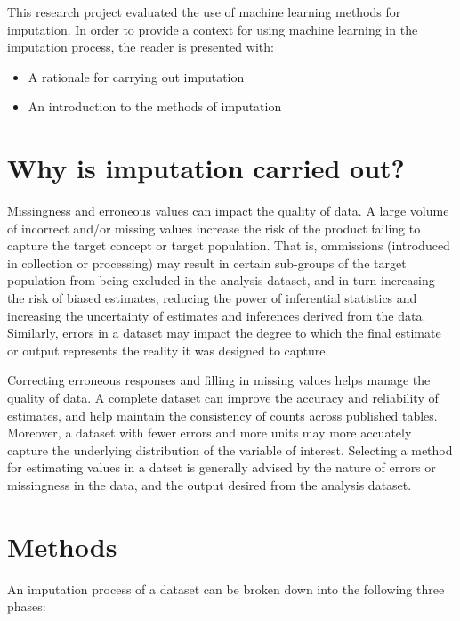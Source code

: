 \documentclass[]{book}
\providecommand{\tightlist}{%
  \setlength{\itemsep}{0pt}\setlength{\parskip}{0pt}}
\begin{document}
This research project evaluated the use of machine learning methods for
imputation. In order to provide a context for using machine learning in
the imputation process, the reader is presented with:

\begin{itemize}
\tightlist
\item
  A rationale for carrying out imputation\\
\item
  An introduction to the methods of imputation
\end{itemize}

\section{Why is imputation carried
out?}\label{why-is-imputation-carried-out}

Missingness and erroneous values can impact the quality of data. A large
volume of incorrect and/or missing values increase the risk of the
product failing to capture the target concept or target population. That
is, ommissions (introduced in collection or processing) may result in
certain sub-groups of the target population from being excluded in the
analysis dataset, and in turn increasing the risk of biased estimates,
reducing the power of inferential statistics and increasing the
uncertainty of estimates and inferences derived from the data.
Similarly, errors in a dataset may impact the degree to which the final
estimate or output represents the reality it was designed to capture.

Correcting erroneous responses and filling in missing values helps
manage the quality of data. A complete dataset can improve the accuracy
and reliability of estimates, and help maintain the consistency of
counts across published tables. Moreover, a dataset with fewer errors
and more units may more accuately capture the underlying distribution of
the variable of interest. Selecting a method for estimating values in a
datset is generally advised by the nature of errors or missingness in
the data, and the output desired from the analysis dataset.

\section{Methods}\label{methods}

An imputation process of a dataset can be broken down into the following
three phases:
\end{document}
